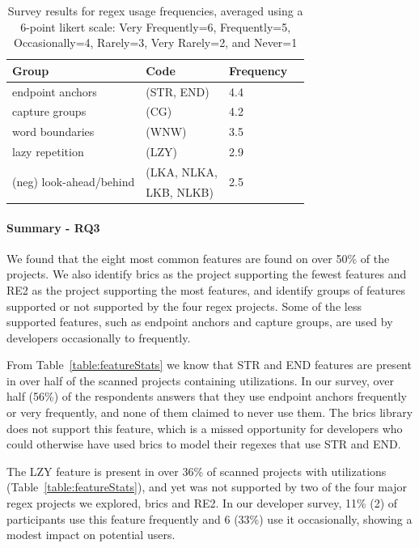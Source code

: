 \begin{table}
\caption{Survey results for regex usage frequencies, averaged using a 6-point likert scale: Very Frequently=6, Frequently=5, Occasionally=4, Rarely=3, Very Rarely=2, and Never=1 \label{tab:regexfeaturegroups}}
\begin{center}
\begin{small}
\begin{tabular}{lllc}
Group & Code &  Frequency \\ \hline
endpoint anchors & (STR, END) & 4.4\\
capture groups & (CG) & 4.2 \\
word boundaries & (WNW) & 3.5 \\
lazy repetition & (LZY) &  2.9\\
\multirow{2}{*}{(neg) look-ahead/behind} &  (LKA, NLKA,  & \multirow{2}{*}{2.5}\\
& LKB, NLKB) & \\
\end{tabular}
\end{small}
\end{center}
\end{table}




\paragraph{Summary - RQ3}
We found that the eight most common features are found on over 50\% of the projects.
We also identify brics as the project supporting the fewest features and RE2 as the project supporting the most features, and identify groups of features supported or not supported by the four regex projects. Some of the less supported features, such as endpoint anchors and capture groups, are used by developers occasionally to frequently.

From Table~\ref{table:featureStats} we know that STR and END features are present in over half of the scanned projects containing utilizations.  In our survey, over half (56\%) of the respondents answers that they use endpoint anchors frequently or very frequently, and none of them claimed to never use them. The brics library does not support this feature, which is a missed opportunity for developers who could otherwise have used brics to model their regexes that use STR and END.

The LZY feature  is present in over 36\% of scanned projects with utilizations (Table~\ref{table:featureStats}), and yet was not supported by two of the four major regex projects we explored, brics and RE2.
In our developer survey, 11\% (2) of participants use this feature frequently and 6 (33\%) use it occasionally, showing a modest impact on potential users.

